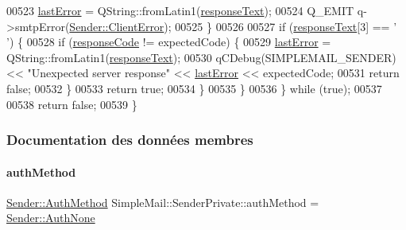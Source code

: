 \begin{DoxyCode}
00523                 \hyperlink{class_simple_mail_1_1_sender_private_a90ae4ff740007836307ede01aad3a277}{lastError} = QString::fromLatin1(\hyperlink{class_simple_mail_1_1_sender_private_ad355d66dfce2628cb0e7e83a5f65d27e}{responseText});
00524                 Q\_EMIT q->smtpError(\hyperlink{class_simple_mail_1_1_sender_a276560e9e955ab6be451338c3776bf49af0e582ca123f321e33c607f9548b913a}{Sender::ClientError});
00525             \}
00526 
00527             \textcolor{keywordflow}{if} (\hyperlink{class_simple_mail_1_1_sender_private_ad355d66dfce2628cb0e7e83a5f65d27e}{responseText}[3] == \textcolor{charliteral}{' '}) \{
00528                 \textcolor{keywordflow}{if} (\hyperlink{class_simple_mail_1_1_sender_private_ac612465360ce40cfa71310f5f7353b3d}{responseCode} != expectedCode) \{
00529                     \hyperlink{class_simple_mail_1_1_sender_private_a90ae4ff740007836307ede01aad3a277}{lastError} = QString::fromLatin1(\hyperlink{class_simple_mail_1_1_sender_private_ad355d66dfce2628cb0e7e83a5f65d27e}{responseText});
00530                     qCDebug(SIMPLEMAIL\_SENDER) << \textcolor{stringliteral}{"Unexpected server response"} << 
      \hyperlink{class_simple_mail_1_1_sender_private_a90ae4ff740007836307ede01aad3a277}{lastError} << expectedCode;
00531                     \textcolor{keywordflow}{return} \textcolor{keyword}{false};
00532                 \}
00533                 \textcolor{keywordflow}{return} \textcolor{keyword}{true};
00534             \}
00535         \}
00536     \} \textcolor{keywordflow}{while} (\textcolor{keyword}{true});
00537 
00538     \textcolor{keywordflow}{return} \textcolor{keyword}{false};
00539 \}
\end{DoxyCode}


\subsubsection{Documentation des données membres}
\mbox{\label{class_simple_mail_1_1_sender_private_afd60fe3edc740b9624746316ad798647}} 
\paragraph{\texorpdfstring{auth\+Method}{authMethod}}
{\footnotesize\ttfamily \hyperlink{class_simple_mail_1_1_sender_af50defb714bc3e95f47c71a9ba6ee6bb}{Sender\+::\+Auth\+Method} Simple\+Mail\+::\+Sender\+Private\+::auth\+Method = \hyperlink{class_simple_mail_1_1_sender_af50defb714bc3e95f47c71a9ba6ee6bba1dd1824451d663ee54b5a528cd8ced74}{Sender\+::\+Auth\+None}}



